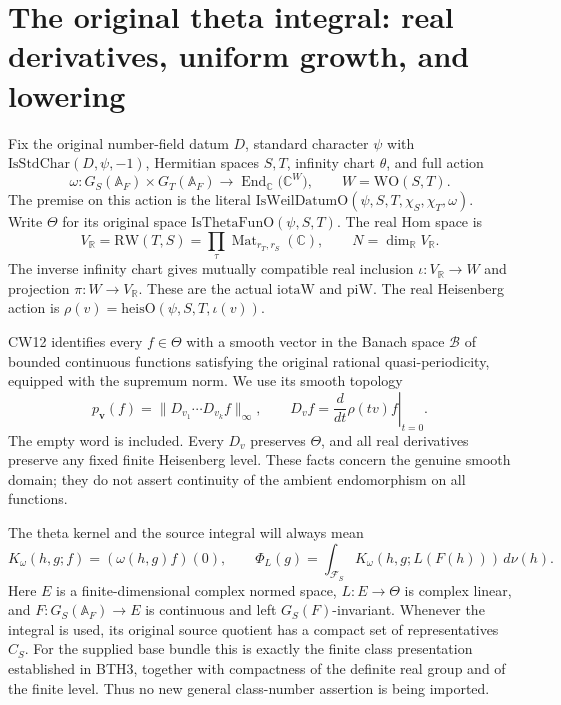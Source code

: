 \section{The original theta integral: real derivatives, uniform growth, and lowering}
\label{sec:theta-extension-v034}


Fix the original number-field datum \(D\), standard character
\(\psi\) with \(\mathrm{IsStdChar}(D,\psi,-1)\), Hermitian spaces
\(S,T\), infinity chart \(\theta\), and full action
\[
 \omega:G_S(\mathbb A_F)\times G_T(\mathbb A_F)
       \longrightarrow\operatorname{End}_{\mathbb C}
                    \bigl(\mathbb C^{W}\bigr),
 \qquad W=\mathrm{WO}(S,T).
 \tag{TAE.1}
\]
The premise on this action is the literal
\(\mathrm{IsWeilDatumO}(\psi,S,T,\chi_S,\chi_T,\omega)\).
Write \(\Theta\) for its original space
\(\mathrm{IsThetaFunO}(\psi,S,T)\).  The real Hom space is
\[
 V_{\mathbb R}=\mathrm{RW}(T,S)
       =\prod_{\tau}\operatorname{Mat}_{r_T,r_S}(\mathbb C),
 \qquad N=\dim_{\mathbb R}V_{\mathbb R}.
 \tag{TAE.2}
\]
The inverse infinity chart gives mutually compatible real inclusion
\(\iota:V_{\mathbb R}\to W\) and projection \(\pi:W\to V_{\mathbb R}\).
These are the actual \(\mathrm{iotaW}\) and \(\mathrm{piW}\).
The real Heisenberg action is
\(\rho(v)=\mathrm{heisO}(\psi,S,T,\iota(v))\).

CW12 identifies every \(f\in\Theta\) with a smooth vector in the Banach
space \(\mathcal B\) of bounded continuous functions satisfying the
original rational quasi-periodicity, equipped with the supremum norm.
We use its smooth topology
\[
 p_{\mathbf v}(f)=
  \|D_{v_1}\cdots D_{v_k}f\|_{\infty},
 \qquad
 D_vf=\left.\frac{d}{dt}\rho(tv)f\right|_{t=0}.
 \tag{TAE.3}
\]
The empty word is included.  Every \(D_v\) preserves \(\Theta\), and
all real derivatives preserve any fixed finite Heisenberg level.
These facts concern the genuine smooth domain; they do not assert
continuity of the ambient endomorphism on all functions.

The theta kernel and the source integral will always mean
\[
 K_\omega(h,g;f)=(\omega(h,g)f)(0),\qquad
 \Phi_L(g)=\int_{\mathcal F_S}
        K_\omega(h,g;L(F(h)))\,d\nu(h).
 \tag{TAE.4}
\]
Here \(E\) is a finite-dimensional complex normed space,
\(L:E\to\Theta\) is complex linear, and
\(F:G_S(\mathbb A_F)\to E\) is continuous and left
\(G_S(F)\)-invariant.  Whenever the integral is used, its original
source quotient has a compact set of representatives \(C_S\).
For the supplied base bundle this is exactly the finite class
presentation established in BTH3, together with compactness of the
definite real group and of the finite level.  Thus no new general
class-number assertion is being imported.

